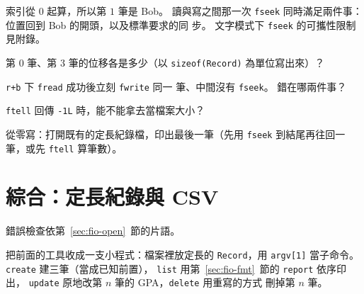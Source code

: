 
索引從 $0$ 起算，所以第 $1$ 筆是 Bob。 讀與寫之間那一次
\texttt{fseek} 同時滿足兩件事：位置回到 Bob 的開頭，以及標準要求的同
步。 文字模式下 \texttt{fseek} 的可攜性限制見附錄。


\begin{drills}[label=drills:fio-seek]
\item 第 $0$ 筆、第 $3$ 筆的位移各是多少（以 \texttt{sizeof(Record)}
為單位寫出來）？
\item \texttt{r+b} 下 \texttt{fread} 成功後立刻 \texttt{fwrite} 同一
筆、中間沒有 \texttt{fseek}。 錯在哪兩件事？
\item \texttt{ftell} 回傳 \texttt{-1L} 時，能不能拿去當檔案大小？
\item 從零寫：打開既有的定長紀錄檔，印出最後一筆（先用
\texttt{fseek} 到結尾再往回一筆，或先 \texttt{ftell} 算筆數）。
\end{drills}

\section{綜合：定長紀錄與 CSV}
\label{sec:fio-combine}

錯誤檢查依第~\ref{sec:fio-open}~節的片語。

把前面的工具收成一支小程式：檔案裡放定長的 \texttt{Record}，用
\texttt{argv[1]} 當子命令。 \texttt{create} 建三筆（當成已知前置），
\texttt{list} 用第~\ref{sec:fio-fmt}~節的 \texttt{report} 依序印出，
\texttt{update} 原地改第 $n$ 筆的 GPA，\texttt{delete} 用重寫的方式
刪掉第 $n$ 筆。

